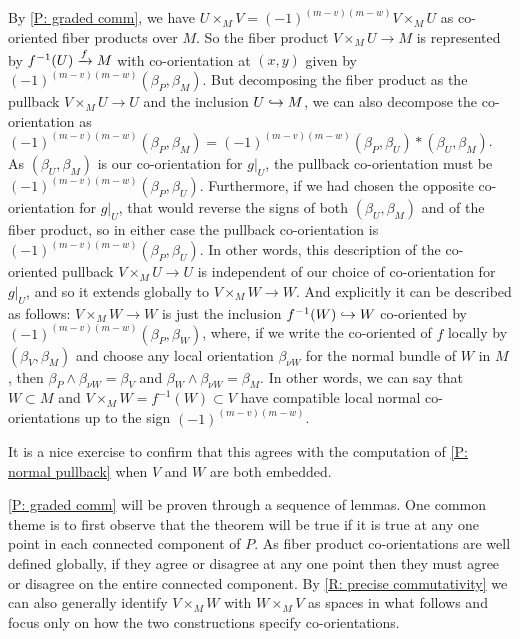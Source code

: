 \begin{example}
By \cref{P: graded comm}, we have  $U\times_MV=(-1)^{(m-v)(m-w)}V\times_MU$ as co-oriented fiber products over $M$. So the fiber product $V\times_MU\to M$ is represented by $f^{-1}(U)\xrightarrow{f}M$ with co-orientation at $(x,y)$ given by $(-1)^{(m-v)(m-w)}(\beta_P,\beta_M)$. But decomposing the fiber product as the pullback $V\times_M U\to U$ and the inclusion $U\hookrightarrow M$, we can also decompose the co-orientation as $(-1)^{(m-v)(m-w)}(\beta_P,\beta_M)=(-1)^{(m-v)(m-w)}(\beta_P,\beta_U)*(\beta_U,\beta_M)$. As $(\beta_U,\beta_M)$ is our co-orientation for $g|_U$, the pullback co-orientation must be $(-1)^{(m-v)(m-w)}(\beta_P,\beta_U)$. Furthermore, if we had chosen the opposite co-orientation for $g|_U$, that would reverse the signs of both $(\beta_U,\beta_M)$  and of the fiber product, so in either case the pullback co-orientation is $(-1)^{(m-v)(m-w)}(\beta_P,\beta_U)$. In other words, this description of the co-oriented pullback $V\times_MU\to U$ is independent of our choice of co-orientation for $g|_U$, and so it extends globally to $V\times_M W\to W$. And explicitly it can be described as follows:
$V\times_MW\to W$ is just the inclusion $f^{-1}(W)\hookrightarrow W$ co-oriented by $(-1)^{(m-v)(m-w)}(\beta_P,\beta_W)$, where, if we write the co-oriented of $f$ locally  by $(\beta_V,\beta_M)$ and choose any local orientation $\beta_{\nu W}$ for the normal bundle of $W$ in $M$, then $\beta_P\wedge \beta_{\nu W}=\beta_V$ and $\beta_W\wedge \beta_{\nu W}=\beta_M$. In other words, we can say that $W\subset M$ and $V\times_MW =f^{-1}(W)\subset V$ have compatible local normal co-orientations up to the sign $(-1)^{(m-v)(m-w)}$.

It is a nice exercise to confirm that this agrees with the computation of \cref{P: normal pullback} when $V$ and $W$ are both embedded.
\end{example}










\cref{P: graded comm} will be proven through a sequence of lemmas. One common theme is to first observe that the theorem will be true if it is true at any one point in each connected component of $P$. As fiber product co-orientations are well defined globally, if they agree or disagree at any one point then they must agree or disagree on the entire connected component. By
\cref{R: precise commutativity}
 we can also generally identify  $V\times_M W$ with $W\times_MV$ as spaces in what follows and focus only on how the two constructions specify co-orientations.


